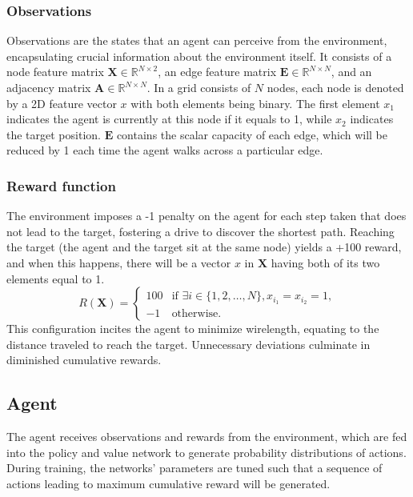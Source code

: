 \documentclass[letterpaper]{article}
\begin{document}
\subsubsection{Observations}
Observations are the states that an agent can perceive from the environment,
encapsulating crucial information about the environment itself. It consists of a
node feature matrix $\mathbf{X} \in \mathbb{R}^{N \times 2}$, an edge feature
matrix $\mathbf{E} \in \mathbb{R}^{N \times N}$, and an adjacency matrix
$\mathbf{A} \in \mathbb{R}^{N \times N}$. In a grid consists of $N$ nodes, each
node is denoted by a 2D feature vector $x$ with both elements being binary. The
first element $x_1$ indicates the agent is currently at this node if it equals
to 1, while $x_2$ indicates the target position. $\mathbf{E}$ contains the
scalar capacity of each edge, which will be reduced by 1 each time the agent
walks across a particular edge. 


\subsubsection{Reward function}
The environment imposes a -1 penalty on the agent for each step taken that does
not lead to the target, fostering a drive to discover the shortest path.
Reaching the target (the agent and the target sit at the same node) yields a
+100 reward, and when this happens, there will be a vector $x$ in $\mathbf{X}$
having both of its two elements equal to 1.
\begin{equation}
    R(\mathbf{X}) = \begin{cases} 
    100 & \text{if } \exists i \in \{1, 2, \ldots, N\}, x_{i_1} = x_{i_2} = 1, \\
    -1 & \text{otherwise}.
    \end{cases}
    \end{equation}
This configuration incites the agent to minimize wirelength, equating to the
distance traveled to reach the target. Unnecessary deviations culminate in
diminished cumulative rewards.

\subsection{Agent}
The agent receives observations and rewards from the environment, which are fed
into the policy and value network to generate probability distributions of
actions. During training, the networks' parameters are tuned such that a
sequence of actions leading to maximum cumulative reward will be generated. 
\end{document}
